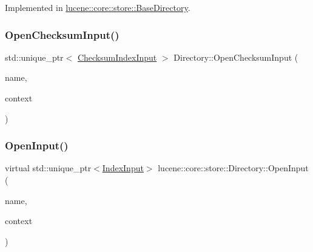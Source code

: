 Implemented in \mbox{\hyperlink{classlucene_1_1core_1_1store_1_1BaseDirectory_a42ea39f7b8b99972e6e39710e0563037}{lucene\+::core\+::store\+::\+Base\+Directory}}.

\mbox{\label{classlucene_1_1core_1_1store_1_1Directory_af23ff345c08fbf7b235d72919d749556}} 
\subsubsection{\texorpdfstring{Open\+Checksum\+Input()}{OpenChecksumInput()}}
{\footnotesize\ttfamily std\+::unique\+\_\+ptr$<$ \mbox{\hyperlink{classlucene_1_1core_1_1store_1_1ChecksumIndexInput}{Checksum\+Index\+Input}} $>$ Directory\+::\+Open\+Checksum\+Input (\begin{DoxyParamCaption}\item[{\mbox{\hyperlink{ZlibCrc32_8h_a2c212835823e3c54a8ab6d95c652660e}{const}} std\+::string \&}]{name,  }\item[{\mbox{\hyperlink{ZlibCrc32_8h_a2c212835823e3c54a8ab6d95c652660e}{const}} \mbox{\hyperlink{classlucene_1_1core_1_1store_1_1IOContext}{I\+O\+Context}} \&}]{context }\end{DoxyParamCaption})}

\mbox{\label{classlucene_1_1core_1_1store_1_1Directory_a4889bc9f58be58f28cc6e0846fbd516c}} 
\subsubsection{\texorpdfstring{Open\+Input()}{OpenInput()}}
{\footnotesize\ttfamily virtual std\+::unique\+\_\+ptr$<$\mbox{\hyperlink{classlucene_1_1core_1_1store_1_1IndexInput}{Index\+Input}}$>$ lucene\+::core\+::store\+::\+Directory\+::\+Open\+Input (\begin{DoxyParamCaption}\item[{\mbox{\hyperlink{ZlibCrc32_8h_a2c212835823e3c54a8ab6d95c652660e}{const}} std\+::string \&}]{name,  }\item[{\mbox{\hyperlink{ZlibCrc32_8h_a2c212835823e3c54a8ab6d95c652660e}{const}} \mbox{\hyperlink{classlucene_1_1core_1_1store_1_1IOContext}{I\+O\+Context}} \&}]{context }\end{DoxyParamCaption})\hspace{0.3cm}{\ttfamily [pure virtual]}}



